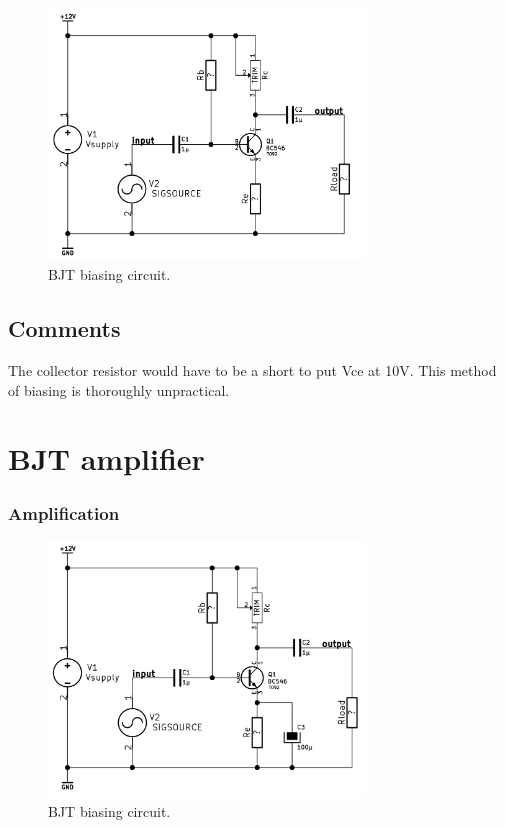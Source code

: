 \documentclass[11pt,a4paper]{article}
\begin{document}
\begin{figure}[htbp]
    \centering
    \includegraphics[width=0.75\textwidth]{img/bjt-bias_1.png}
    \caption{BJT biasing circuit.}
    \label{fig:bjt-bias_1}
\end{figure}

\subsection{Comments}\label{comments}
The collector resistor would have to be a short to put Vce at 10V. This method
of biasing is thoroughly unpractical.


\section{BJT amplifier}\label{bjt-amplifier}

\subsubsection{Amplification}\label{amplification}

\begin{figure}[htbp]
    \centering
    \includegraphics[width=0.75\textwidth]{img/bjt-bias_2AC.png}
    \caption{BJT biasing circuit.}
    \label{fig:bjt-bias_2AC}
\end{figure}
\end{document}
